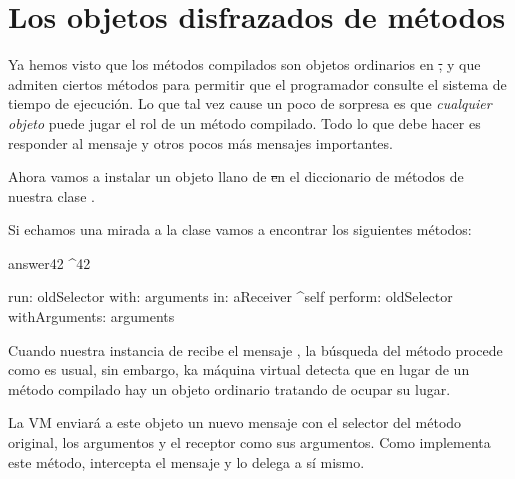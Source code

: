 \documentclass[a4paper,10pt,twoside]{book}
\begin{document}
\section{Los objetos disfrazados de métodos}

Ya hemos visto que los métodos compilados son objetos ordinarios en
\st, y que admiten ciertos métodos para permitir que el programador
consulte el sistema de tiempo de ejecución.  Lo que tal vez cause un
poco de sorpresa es que \emph{cualquier objeto}  puede jugar el rol de
un método compilado.  Todo lo que debe hacer es responder al mensaje
 y otros pocos más mensajes importantes.



Ahora vamos a instalar un objeto llano de \st en el diccionario de
métodos de nuestra clase .



Si echamos una mirada a la clase 
vamos a encontrar los siguientes métodos:

\begin{code}{}
answer42
        ^42

run: oldSelector with: arguments in: aReceiver
        ^self perform: oldSelector withArguments: arguments
\end{code}

Cuando nuestra instancia de  recibe el mensaje ,
la búsqueda del método procede como es usual, sin embargo, ka máquina
virtual detecta que en lugar de un método compilado hay un objeto
ordinario tratando de ocupar su lugar.

La VM enviará a este objeto un nuevo mensaje  con el
selector del método original, los argumentos y el receptor como sus
argumentos.
Como   implementa este método, intercepta
el mensaje y lo delega a sí mismo.
\end{document}

